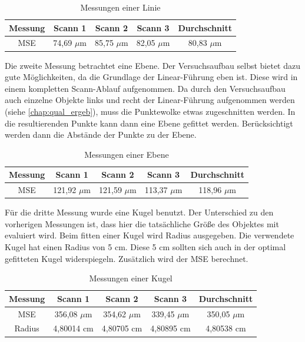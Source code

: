 		\begin{table}[h]
			\centering
			
			\begin{tabular}[h]{c|c|c|c||c}
				Messung & Scann 1 & Scann 2 & Scann 3 & Durchschnitt \\
				\hline
				MSE & 74,69 $\mu$m & 85,75 $\mu$m & 82,05 $\mu$m & 80,83 $\mu$m \\
				\hline
			\end{tabular}
		
			\caption{Messungen einer Linie}
			\label{tab:linie}
			
		\end{table}
	
		Die zweite Messung betrachtet eine Ebene. Der Versuchsaufbau selbst bietet dazu gute Möglichkeiten, da die Grundlage der Linear-Führung eben ist. Diese wird in einem kompletten Scann-Ablauf aufgenommen. Da durch den Versuchsaufbau auch einzelne Objekte links und recht der Linear-Führung aufgenommen werden (siehe \ref{chap:qual_ergeb}), muss die Punktewolke etwas zugeschnitten werden. In die resultierenden Punkte kann dann eine Ebene gefittet werden. Berücksichtigt werden dann die Abstände der Punkte zu der Ebene.
		
		\begin{table}[h]
			\centering
			
			\begin{tabular}[h]{c|c|c|c||c}
				Messung & Scann 1 & Scann 2 & Scann 3 & Durchschnitt \\
				\hline
				MSE & 121,92 $\mu$m & 121,59 $\mu$m & 113,37 $\mu$m & 118,96 $\mu$m \\
				\hline
			\end{tabular}
		
			\caption{Messungen einer Ebene}
			\label{tab:ebene}
			
		\end{table}
	
		Für die dritte Messung wurde eine Kugel benutzt. Der Unterschied zu den vorherigen Messungen ist, dass hier die tatsächliche Größe des Objektes mit evaluiert wird. Beim fitten einer Kugel wird Radius ausgegeben. Die verwendete Kugel hat einen Radius von 5 cm. Diese 5 cm sollten sich auch in der optimal gefitteten Kugel widerspiegeln. Zusätzlich wird der MSE berechnet.
	
		\begin{table}[h]
			\centering
			
			\begin{tabular}[h]{c|c|c|c||c}
				Messung & Scann 1 & Scann 2 & Scann 3 & Durchschnitt \\
				\hline
				MSE & 356,08 $\mu$m & 354,62 $\mu$m & 339,45 $\mu$m & 350,05 $\mu$m \\
				\hline
				Radius & 4,80014 cm & 4,80705 cm & 4,80895 cm & 4,80538 cm \\
				\hline
			\end{tabular}
		
			\caption{Messungen einer Kugel}
			\label{tab:sphere}
			
		\end{table}
	

